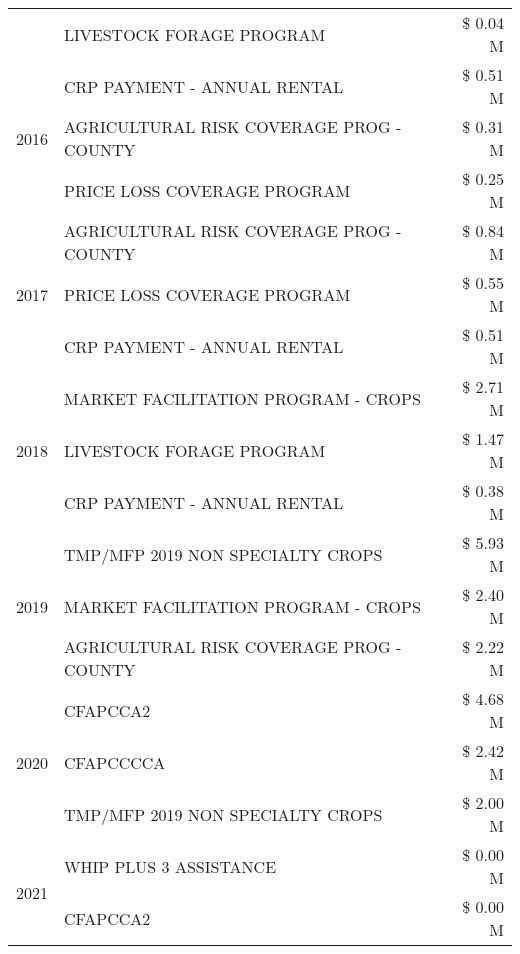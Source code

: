 \begin{tabular}{llr}
 & LIVESTOCK FORAGE PROGRAM & \$ 0.04 M \\
\cline{1-3}
\multirow[t]{3}{*}{2016} & CRP PAYMENT - ANNUAL RENTAL & \$ 0.51 M \\
 & AGRICULTURAL RISK COVERAGE PROG - COUNTY & \$ 0.31 M \\
 & PRICE LOSS COVERAGE PROGRAM & \$ 0.25 M \\
\cline{1-3}
\multirow[t]{3}{*}{2017} & AGRICULTURAL RISK COVERAGE PROG - COUNTY & \$ 0.84 M \\
 & PRICE LOSS COVERAGE PROGRAM & \$ 0.55 M \\
 & CRP PAYMENT - ANNUAL RENTAL & \$ 0.51 M \\
\cline{1-3}
\multirow[t]{3}{*}{2018} & MARKET FACILITATION PROGRAM - CROPS & \$ 2.71 M \\
 & LIVESTOCK FORAGE PROGRAM & \$ 1.47 M \\
 & CRP PAYMENT - ANNUAL RENTAL & \$ 0.38 M \\
\cline{1-3}
\multirow[t]{3}{*}{2019} & TMP/MFP 2019 NON SPECIALTY CROPS & \$ 5.93 M \\
 & MARKET FACILITATION PROGRAM - CROPS & \$ 2.40 M \\
 & AGRICULTURAL RISK COVERAGE PROG - COUNTY & \$ 2.22 M \\
\cline{1-3}
\multirow[t]{3}{*}{2020} & CFAPCCA2 & \$ 4.68 M \\
 & CFAPCCCCA & \$ 2.42 M \\
 & TMP/MFP 2019 NON SPECIALTY CROPS & \$ 2.00 M \\
\cline{1-3}
\multirow[t]{2}{*}{2021} & WHIP PLUS 3 ASSISTANCE & \$ 0.00 M \\
 & CFAPCCA2 & \$ 0.00 M \\
\cline{1-3}
\bottomrule
\end{tabular}
